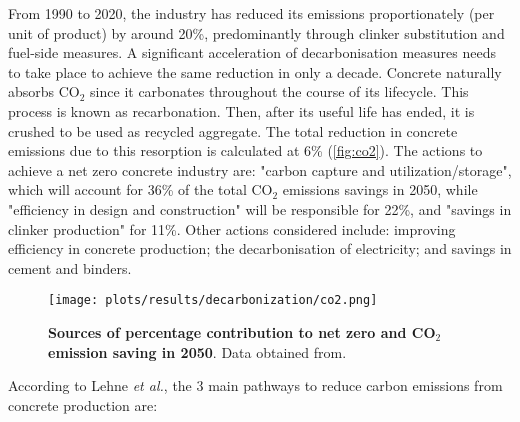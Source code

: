 From 1990 to 2020, the industry has reduced its emissions proportionately (per unit of product) by around 20\%, predominantly through clinker substitution and fuel-side measures. A significant acceleration of decarbonisation measures needs to take place to achieve the same reduction in only a decade.\autocite{cement2021concrete} Concrete naturally absorbs CO$_2$ since it carbonates throughout the course of its lifecycle. This process is known as recarbonation. Then, after its useful life has ended, it is crushed to be used as recycled aggregate. The total reduction in concrete emissions due to this resorption is calculated at 6\%\autocite{aus_2022} (\autoref{fig:co2}). The actions to achieve a net zero concrete industry are: "carbon capture and utilization/storage", which will account for 36\% of the total CO$_2$ emissions savings in 2050, while "efficiency in design and construction" will be responsible for 22\%, and "savings in clinker production" for 11\%. Other actions considered include: improving efficiency in concrete production; the decarbonisation of electricity; and savings in cement and binders.

\begin{figure}[ht!]
  \centering
  \texttt{[image: plots/results/decarbonization/co2.png]}
  \caption[Sources of percentage contribution to net zero and CO$_2$ emission saving in 2050]{\textbf{Sources of percentage contribution to net zero and CO$_2$ emission saving in 2050}. Data obtained from.\autocite{aus_2022}}
  \label{fig:co2}
\end{figure}

According to Lehne \textit{et al.},\autocite{lehne2018making} the 3 main pathways to reduce carbon emissions from concrete production are:

